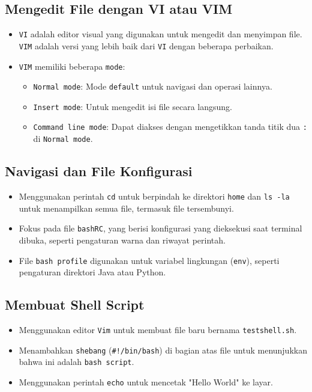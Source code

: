 \documentclass{article}
\begin{document}
\subsection{Mengedit File dengan VI atau VIM}
\begin{itemize}
    \item \texttt{VI} adalah editor visual yang digunakan untuk mengedit dan menyimpan file. \texttt{VIM} adalah versi yang lebih baik dari \texttt{VI} dengan beberapa perbaikan.
    \item \texttt{VIM} memiliki beberapa \texttt{mode}:
          \begin{itemize}
              \item \texttt{Normal mode}: Mode \texttt{default} untuk navigasi dan operasi lainnya.
              \item \texttt{Insert mode}: Untuk mengedit isi file secara langsung.
              \item \texttt{Command line mode}: Dapat diakses dengan mengetikkan tanda titik dua \texttt{:} di \texttt{Normal mode}.
          \end{itemize}
\end{itemize}

\subsection{Navigasi dan File Konfigurasi}
\begin{itemize}
    \item Menggunakan perintah \texttt{cd} untuk berpindah ke direktori \texttt{home} dan \texttt{ls -la} untuk menampilkan semua file, termasuk file tersembunyi.
    \item Fokus pada file \texttt{bashRC}, yang berisi konfigurasi yang dieksekusi saat terminal dibuka, seperti pengaturan warna dan riwayat perintah.
    \item File \texttt{bash profile} digunakan untuk variabel lingkungan (\texttt{env}), seperti pengaturan direktori Java atau Python.
\end{itemize}

\subsection{Membuat Shell Script}
\begin{itemize}
    \item Menggunakan editor \texttt{Vim} untuk membuat file baru bernama \texttt{testshell.sh}.
    \item Menambahkan \texttt{shebang} (\texttt{\#!/bin/bash}) di bagian atas file untuk menunjukkan bahwa ini adalah \texttt{bash script}.
    \item Menggunakan perintah \texttt{echo} untuk mencetak "Hello World" ke layar.
\end{itemize}
\end{document}
